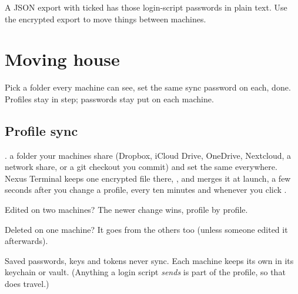 
\begin{danger}
A JSON export with  ticked has those login-script passwords in plain text. Use the encrypted  export to
move things between machines.
\end{danger}


\chapter{Moving house}\label{ch:move}

\begin{tldr}
Pick a folder every machine can see, set the same sync password on each, done. Profiles stay in step; passwords
stay put on each machine.
\end{tldr}

\section{Profile sync}

.  a folder your machines share (Dropbox, iCloud Drive,
OneDrive, Nextcloud, a network share, or a git checkout you commit) and set the same  everywhere.
Nexus Terminal keeps one encrypted file there, , and merges it at launch, a few seconds
after you change a profile, every ten minutes and whenever you click .

\begin{checklist}
  \item[\color{green}\iCheck] Edited on two machines? The newer change wins, profile by profile.
  \item[\color{green}\iCheck] Deleted on one machine? It goes from the others too (unless someone edited it afterwards).
  \item[\color{rose}\ph{E4F6}] Saved passwords, keys and tokens never sync. Each machine keeps its own in its keychain or vault.
        (Anything a login script \emph{sends} is part of the profile, so that does travel.)
\end{checklist}

